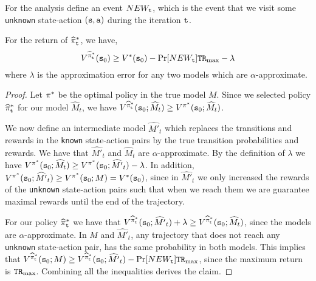 For the analysis define an event $NEW_{\tt t}$, which is the event that we
visit some \texttt{unknown} state-action $({\tt s},{\tt a})$ during the iteration ${\tt t}$.
\begin{claim}
For the return of $\widehat{\pi}^*_{\tt t}$, we have,
\[
V^{\widehat{\pi}^*_{\tt t}}({\tt s}_0)\geq V^*({\tt s}_0) -
\Pr[NEW_{\tt t}]{\tt T}{\tt R}_{\max }-\lambda
\]
where $\lambda$ is the approximation error for any two models which are $\alpha$-approximate.
\end{claim}

\begin{proof}
Let $\pi^*$ be the optimal policy in the true model $M$. Since we selected policy $\widehat{\pi}^*_{\tt t}$ for our model $\widehat{M}_t$, we have $V^{\widehat{\pi}^*_{\tt t}}({\tt s}_0;\widehat{M}_t)\geq V^{\pi^*}({\tt s}_0;\widehat{M}_t)$. 

We now define an intermediate model $\widehat{M'}_t$ which replaces the transitions and rewards in the \texttt{known} state-action pairs by the true transition probabilities and rewards. We have that $\widehat{M'}_t$ and $\widehat{M}_t$ are $\alpha$-approximate.
By the definition of $\lambda$ we have $V^{\pi^*}({\tt s}_0;\widehat{M}_t)\geq V^{\pi^*}({\tt s}_0;\widehat{M'}_t)-\lambda$. In addition, $V^{\pi^*}({\tt s}_0;\widehat{M'}_t)\geq V^{\pi^*}({\tt s}_0;M)=V^*({\tt s}_0)$, since in $\widehat{M'}_t$ we only increased the rewards of the \texttt{unknown} state-action pairs such that when we reach them we are guarantee maximal rewards until the end of the trajectory.

For our policy $\widehat{\pi}^*_{\tt t}$ we have that 
 $V^{\widehat{\pi}^*_{\tt t}}({\tt s}_0;\widehat{M'}_t)+\lambda\geq V^{\widehat{\pi}^*_{\tt t}}({\tt s}_0;\widehat{M}_t)$, since the models are $\alpha$-approximate.
%
In $M$ and $\widehat{M'}_t$, any trajectory that does not reach any \texttt{unknown} state-action pair, has the same probability in both models. This implies that 
  $V^{\widehat{\pi}^*_{\tt t}}({\tt s}_0;M)\geq V^{\widehat{\pi}^*_{\tt t}}({\tt s}_0;\widehat{M'}_t)-\Pr[NEW_{\tt t}]{\tt T}{\tt R}_{\max }$, since the maximum return is ${\tt T}{\tt R}_{\max }$. Combining all the inequalities derives the claim.
\end{proof}


